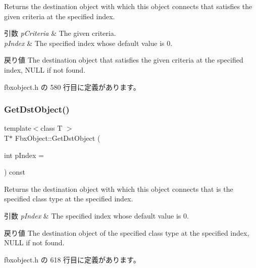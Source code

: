 Returns the destination object with which this object connects that satisfies the given criteria at the specified index. 
\begin{DoxyParams}{引数}
{\em p\+Criteria} & The given criteria. \\
\hline
{\em p\+Index} & The specified index whose default value is 0. \\
\hline
\end{DoxyParams}
\begin{DoxyReturn}{戻り値}
The destination object that satisfies the given criteria at the specified index, N\+U\+LL if not found. 
\end{DoxyReturn}


 fbxobject.\+h の 580 行目に定義があります。

\mbox{\label{class_fbx_object_a07c0fb98b3aba9a646f5bbf849c0e6da}} 
\subsubsection{\texorpdfstring{Get\+Dst\+Object()}{GetDstObject()}\hspace{0.1cm}{\footnotesize\ttfamily [3/4]}}
{\footnotesize\ttfamily template$<$class T $>$ \\
T$\ast$ Fbx\+Object\+::\+Get\+Dst\+Object (\begin{DoxyParamCaption}\item[{int}]{p\+Index = {} }\end{DoxyParamCaption}) const\hspace{0.3cm}{\ttfamily [inline]}}

Returns the destination object with which this object connects that is the specified class type at the specified index. 
\begin{DoxyParams}{引数}
{\em p\+Index} & The specified index whose default value is 0. \\
\hline
\end{DoxyParams}
\begin{DoxyReturn}{戻り値}
The destination object of the specified class type at the specified index, N\+U\+LL if not found. 
\end{DoxyReturn}


 fbxobject.\+h の 618 行目に定義があります。

\mbox{\label{class_fbx_object_a4482176c100b07f3c4d7a0f20f2b04ff}} 
